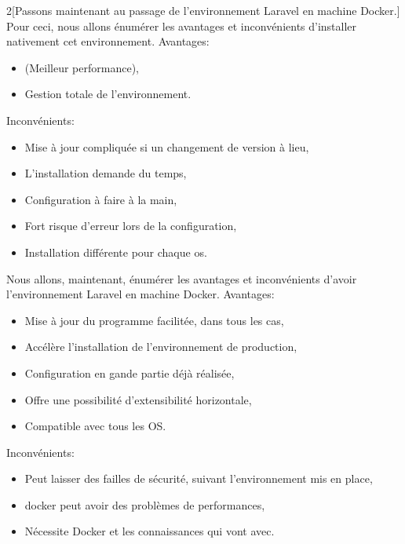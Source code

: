 \documentclass[
    iai, %
    il, %
]{heig-tb}
\begin{document}
\begin{multicols}{2}[Passons maintenant au passage de l'environnement Laravel en machine Docker.]
    Pour ceci, nous allons énumérer les avantages et inconvénients d'installer nativement cet environnement.
    Avantages:
    \begin{itemize}
        \item (Meilleur performance),
        \item Gestion totale de l'environnement.
    \end{itemize}

    Inconvénients:
    \begin{itemize}
        \item Mise à jour compliquée si un changement de version à lieu,
        \item L'installation demande du temps,
        \item Configuration à faire à la main,
        \item Fort risque d'erreur lors de la configuration,
        \item Installation différente pour chaque \Gls{os}.
    \end{itemize}

    \columnbreak
    Nous allons, maintenant, énumérer les avantages et inconvénients d'avoir l'environnement Laravel en machine Docker.
    Avantages:
    \begin{itemize}
        \item Mise à jour du programme facilitée, dans tous les cas,
        \item Accélère l'installation de l'environnement de production,
        \item Configuration en gande partie déjà réalisée,
        \item Offre une possibilité d'extensibilité horizontale,
        \item Compatible avec tous les OS.
    \end{itemize}

    Inconvénients:
    \begin{itemize}
        \item Peut laisser des failles de sécurité, suivant l'environnement mis en place,
        \item \Gls{docker} peut avoir des problèmes de performances, \cite{labrecque}
        \item Nécessite Docker et les connaissances qui vont avec. \cite{labrecque}
    \end{itemize}
\end{multicols}
\end{document}
